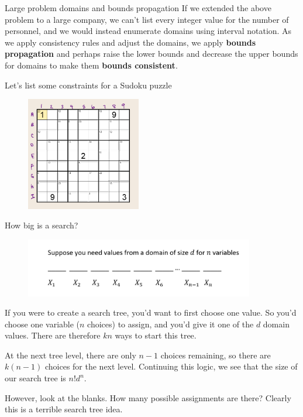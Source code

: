 \documentclass{beamer}
\begin{document}
\begin{frame}{Large problem domains and bounds propagation}
    If we extended the above problem to a large company, we can't 
    list every integer value for the number of personnel, and we 
    would instead enumerate domains using interval notation. As we 
    apply consistency rules and adjust the domains, we apply {\bf bounds
    propagation} and perhaps raise the 
    lower bounds and decrease the upper bounds for domains to make them {\bf bounds consistent}.

\end{frame}

\begin{frame}[t]{Let's list some constraints for a Sudoku puzzle}
    \begin{figure}
        \includegraphics[width=5cm]{images/sudoku}
    \end{figure}

    
\end{frame}

\begin{frame}{How big is a search?}
    \small

    \begin{figure}
        \includegraphics[width=10cm]{images/csp_search}
    \end{figure}

    If you were to create a search tree, you'd want to first choose one
    value. So you'd choose one variable ($n$ choices) to assign, and you'd
    give it one of the $d$ domain values. There are therefore $kn$ ways to start 
    this tree.

    \vspace{0.1in}

    At the next tree level, there are only $n-1$ choices remaining, so there are
    $k(n-1)$ choices for the next level. Continuing this logic, we see that
    the size of our search tree is $n!d^n$.

    \vspace{0.1in}

    However, look at the blanks. How many possible assignments are there? Clearly
    this is a terrible search tree idea.
    
\end{frame}
\end{document}
